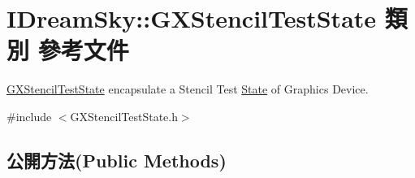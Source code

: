 \hypertarget{class_i_dream_sky_1_1_g_x_stencil_test_state}{}\section{I\+Dream\+Sky\+:\+:G\+X\+Stencil\+Test\+State 類別 參考文件}
\label{class_i_dream_sky_1_1_g_x_stencil_test_state}


\hyperlink{class_i_dream_sky_1_1_g_x_stencil_test_state}{G\+X\+Stencil\+Test\+State} encapsulate a Stencil Test \hyperlink{class_i_dream_sky_1_1_state}{State} of Graphics Device.  




{\ttfamily \#include $<$G\+X\+Stencil\+Test\+State.\+h$>$}

\subsection*{公開方法(Public Methods)}
